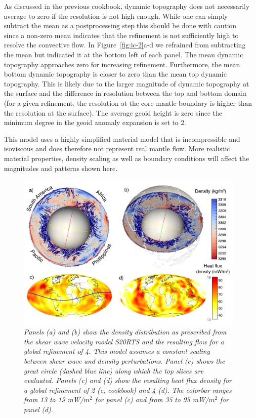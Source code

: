 \documentclass{article}
\begin{document}
As discussed in the previous cookbook, dynamic topography does not necessarily 
average to zero if the resolution is not high enough. While one can simply subtract
the mean as a postprocessing step this should be done with caution since a non-zero
mean indicates that the refinement is not sufficiently high to resolve the
convective flow. In Figure~\ref{fig:ic-2}a-d we refrained from subtracting the mean but 
indicated it at the bottom left of each panel. The mean dynamic 
topography approaches zero for increasing refinement. Furthermore, the mean bottom 
dynamic topography is closer to zero than the mean top dynamic topography. This is 
likely due to the larger magnitude of dynamic topography at the surface and the
difference in resolution between the top and bottom domain
(for a given refinement, the resolution at the core mantle boundary is
higher than the resolution at the surface). The average geoid height is zero since
the minimum degree in the geoid anomaly expansion is set to 2. 

This model uses a highly simplified material model that is incompressible and 
isoviscous and does therefore not represent real mantle flow. More realistic 
material properties, density scaling as well as boundary conditions will affect the magnitudes
and patterns shown here. 

\begin{figure}
  \includegraphics[width=\textwidth]{cookbooks/initial-condition-S20RTS/Fig_cookbook_V4-01.png}
  \hfill
  \caption{\it Panels (a) and (b) show the density distribution as prescribed from the shear
  wave velocity model S20RTS and the resulting flow for a global refinement of 4. This
  model assumes a constant scaling between shear wave and density perturbations.
  Panel (c) shows the great circle (dashed blue line) along which the top slices
  are evaluated. Panels (c) and (d) show the resulting heat flux density for a global refinement of
  2 (c, cookbook) and 4 (d). The colorbar ranges from 13 to 19 mW/$m^2$ for panel (c) and
  from 35 to 95 mW/$m^2$ for panel (d).}
  \label{fig:ic-1}
\end{figure}
\end{document}
